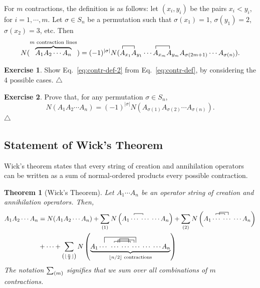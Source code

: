 \documentclass{report}
\theoremstyle{plain}
\newtheorem{theorem}{Theorem}[chapter]
\theoremstyle{definition}
\newtheorem{exerc}{Exercise}[chapter]
\newcommand\xqed[1]{%
  \leavevmode\unskip\penalty9999 \hbox{}\nobreak\hfill
  \quad\hbox{#1}}
\newcommand\demo{\xqed{$\triangle$}}
\newenvironment{exercise}{\bigskip\begin{exerc}}{\demo\end{exerc}\bigskip}
\begin{document}
For $m$ contractions, the definition is as follows: let
$(x_i,y_i)$ be the pairs $x_i<y_i$, for $i=1,\cdots, m$. Let
$\sigma\in S_n$ be a permutation such that $\sigma(x_1) = 1$,
$\sigma(y_1) = 2$, $\sigma(x_2)=3$, etc. Then
\begin{equation}
  N(\overbrace{A_1A_2\cdots A_n}^{\text{$m$ contraction lines}}) = (-1)^{|\sigma|}
  N(\contraction{}{A}{{}_{x_1}}{A} A_{x_1} A_{y_1}\cdots
  \contraction{}{A}{{}_{x_m}}{A} A_{x_m} A_{y_m} A_{\sigma(2m+1)} \cdots A_{\sigma(n)}).
\end{equation}


\begin{exercise}\label{exercise:contraction-relation}
  Show Eq.~\eqref{eq:contr-def-2} from Eq.~\eqref{eq:contr-def}, by
  considering the 4 possible cases.
\end{exercise}

\begin{exercise}
Prove that, for any permutation $\sigma \in S_n$,
\begin{equation}
  N({A}_1 {A}_2 \cdots {A}_n) = (-1)^{|\sigma|}
  N({A}_{\sigma(1)} {A}_{\sigma(2)} \cdots {A}_{\sigma(n)}).
\end{equation}
\end{exercise}


\subsection{Statement of Wick's Theorem}

Wick's theorem states that every string of creation and annihilation
operators can be written as a sum of normal-ordered products every
possible contraction. 

\begin{theorem}[Wick's Theorem]
  Let $A_1\cdots A_n$ be an operator string of creation and
  annihilation operators. Then,
\begin{equation}
\begin{split}
\label{eq:wick-statement}
A_1 A_2 \cdots A_n &= N(A_1 A_2\cdots A_n) + \sum_{\pr{1}} \kpr{ A_1 \contraction[.5ex]{.}{A}{..}{A}
\cdots \; \cdots \; \cdots A_n}
+ \sum_{\pr{2}} \kpr{ A_1 \contraction[.5ex]{.}{A}{..}{A} \contraction[1ex]{...}{A}{..}{A}
\cdots \; \cdots \; \cdots A_n}
\\
&+ \cdots +
\sum_{\pr{\lfloor{\frac{n}{2}}\rfloor}}  
\kpr{ \underbrace{A_1 \contraction[2ex]{..}{A}{\hspace{4em}}{A} \cdots\; \contraction[.5ex]{.}{A}{......}{A} \contraction[1.5ex]{....}{A}{..}{A}\contraction[1ex]{...}{A}{......}{A}
\cdots \; \cdots \; \cdots \; \cdots \;\cdots A_n}_{\text{$\lfloor n/2\rfloor$ contractions}}}
\end{split}
\end{equation}
The notation $\sum_{\left(m\right)}$ signifies that we sum over all
combinations of $m$ contractions.
\end{theorem}
\end{document}
